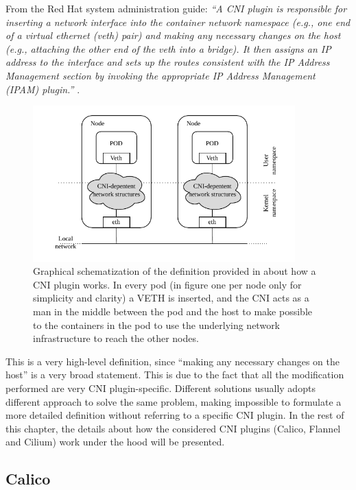 From the Red Hat system administration guide:
\textit{``A CNI plugin is responsible for inserting a network interface into the
    container network namespace (e.g., one end of a virtual ethernet (veth)
    pair) and making any necessary changes on the host (e.g., attaching the
    other end of the veth into a bridge). It then assigns an IP address to the
    interface and sets up the routes consistent with the IP Address Management
    section by invoking the appropriate IP Address Management (IPAM) plugin.''
} \cite{redhat-cni}.


\begin{figure}[H]
  \centering
  \includegraphics[width=0.9\textwidth]{img/chpt2/CNI-generic}
  \caption{Graphical schematization of the definition provided in
    \cite{redhat-cni} about how a CNI plugin works. In every pod (in figure one
    per node only for simplicity and clarity) a VETH is inserted, and the CNI
    acts as a man in the middle between the pod and the host to make possible to
    the containers in the pod to use the underlying network infrastructure to
    reach the other nodes.}
  \label{fig:cni-generic}
\end{figure}


This is a very high-level definition, since ``making any necessary changes on
the host'' is a very broad statement. This is due to the fact that all the
modification performed are very CNI plugin-specific. Different solutions usually
adopts different approach to solve the same problem, making impossible to
formulate a more detailed definition without referring to a specific CNI plugin.
In the rest of this chapter, the details about how the considered CNI plugins
(Calico, Flannel and Cilium) work under the hood will be presented.


\subsection{Calico}\label{subsec:calico}

